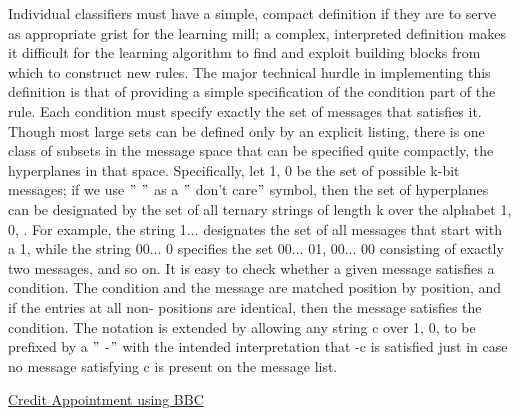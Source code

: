 \documentclass[12pt]{article}
\renewcommand{\_}{\kern-1.5pt\textunderscore\kern-1.5pt}
\begin{document}
Individual classifiers must have a simple, compact definition if they are to serve as appropriate grist for the learning mill; a complex, interpreted definition makes it difficult for the learning algorithm to find and exploit building blocks from which to construct new rules. The major technical hurdle in implementing this definition is that of providing a simple specification of the condition part of the rule. Each condition must specify exactly the set of messages that satisfies it. Though most large sets can be defined only by an explicit listing, there is one class of subsets in the message space that can be specified quite compactly, the hyperplanes in that space. Specifically, let 1, 0 be the set of possible k-bit messages; if we use $"$ $"$  as a $"$ don’t care$"$  symbol, then the set of hyperplanes can be designated by the set of all ternary strings of length k over the alphabet 1, 0, . For example, the string 1... designates the set of all messages that start with a 1, while the string 00... 0 specifies the set 00... 01, 00... 00 consisting of exactly two messages, and so on. It is easy to check whether a given message satisfies a condition. The condition and the message are matched position by position, and if the entries at all non- positions are identical, then the message satisfies the condition. The notation is extended by allowing any string c over 1, 0, to be prefixed by a $"$ -$"$  with the intended interpretation that -c is satisfied just in case no message satisfying c is present on the message list.\par

{\fontsize{14pt}{16.8pt}\selectfont \uline{Credit Appointment using BBC }\par}\par
\end{document}
